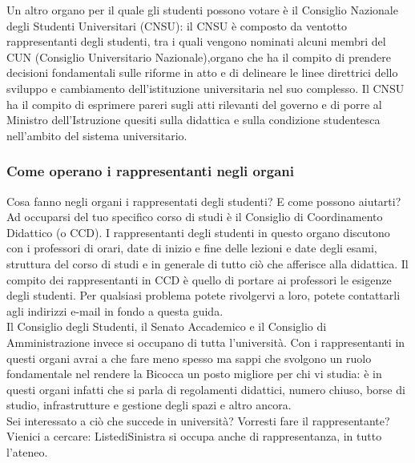 \linebreack
Un altro organo per il quale gli studenti possono votare è il Consiglio Nazionale degli Studenti Universitari (CNSU): il CNSU è composto da ventotto rappresentanti degli studenti, tra i quali vengono nominati alcuni membri del CUN (Consiglio Universitario Nazionale),organo che ha il compito di prendere decisioni fondamentali sulle riforme in atto e di delineare le linee direttrici dello sviluppo e cambiamento dell'istituzione universitaria nel suo complesso. Il CNSU ha il compito di esprimere pareri sugli atti rilevanti del governo e di porre al Ministro dell'Istruzione quesiti sulla didattica e  sulla condizione studentesca nell'ambito del sistema universitario. 

\subsubsection{Come operano i rappresentanti negli organi}
Cosa fanno negli organi i rappresentati degli studenti? E come possono aiutarti?\\
Ad occuparsi del tuo specifico corso di studi è il Consiglio di Coordinamento Didattico (o CCD). I rappresentanti degli studenti in questo organo discutono con i professori di orari, date di inizio e fine delle lezioni e date degli esami, struttura del corso di studi e in generale di tutto ciò che afferisce alla didattica. Il compito dei rappresentanti in CCD è quello di portare ai professori le esigenze degli studenti. Per qualsiasi problema potete rivolgervi a loro, potete contattarli agli indirizzi e-mail in fondo a questa guida.\\
Il Consiglio degli Studenti, il Senato Accademico e il Consiglio di Amministrazione invece si occupano di tutta l'università. Con i rappresentanti in questi organi avrai a che fare meno spesso ma sappi che svolgono un ruolo fondamentale nel rendere la Bicocca un posto migliore per chi vi studia: è in questi organi infatti che si parla di regolamenti didattici, numero chiuso, borse di studio, infrastrutture e gestione degli spazi e altro ancora.\\
Sei interessato a ciò che succede in università? Vorresti fare il rappresentante? Vienici a cercare: ListediSinistra si occupa anche di rappresentanza, in tutto l'ateneo.
